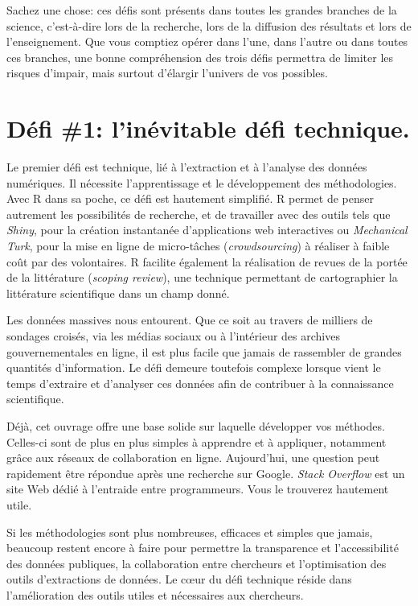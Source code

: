 \documentclass[
  letterpaper,
]{scrbook}
\begin{document}
Sachez une chose: ces défis sont présents dans toutes les grandes
branches de la science, c'est-à-dire lors de la recherche, lors de la
diffusion des résultats et lors de l'enseignement. Que vous comptiez
opérer dans l'une, dans l'autre ou dans toutes ces branches, une bonne
compréhension des trois défis permettra de limiter les risques d'impair,
mais surtout d'élargir l'univers de vos possibles.

\hypertarget{duxe9fi-1-linuxe9vitable-duxe9fi-technique.}{%
\section{Défi \#1: l'inévitable défi
technique.}\label{duxe9fi-1-linuxe9vitable-duxe9fi-technique.}}

Le premier défi est technique, lié à l'extraction et à l'analyse des
données numériques. Il nécessite l'apprentissage et le développement des
méthodologies. Avec R dans sa poche, ce défi est hautement simplifié. R
permet de penser autrement les possibilités de recherche, et de
travailler avec des outils tels que \emph{Shiny}, pour la création
instantanée d'applications web interactives ou \emph{Mechanical Turk},
pour la mise en ligne de micro-tâches (\emph{crowdsourcing}) à réaliser
à faible coût par des volontaires. R facilite également la réalisation
de revues de la portée de la littérature (\emph{scoping review}), une
technique permettant de cartographier la littérature scientifique dans
un champ donné.

Les données massives nous entourent. Que ce soit au travers de milliers
de sondages croisés, via les médias sociaux ou à l'intérieur des
archives gouvernementales en ligne, il est plus facile que jamais de
rassembler de grandes quantités d'information. Le défi demeure toutefois
complexe lorsque vient le temps d'extraire et d'analyser ces données
afin de contribuer à la connaissance scientifique.

Déjà, cet ouvrage offre une base solide sur laquelle développer vos
méthodes. Celles-ci sont de plus en plus simples à apprendre et à
appliquer, notamment grâce aux réseaux de collaboration en ligne.
Aujourd'hui, une question peut rapidement être répondue après une
recherche sur Google. \emph{Stack Overflow} est un site Web dédié à
l'entraide entre programmeurs. Vous le trouverez hautement utile.

Si les méthodologies sont plus nombreuses, efficaces et simples que
jamais, beaucoup restent encore à faire pour permettre la transparence
et l'accessibilité des données publiques, la collaboration entre
chercheurs et l'optimisation des outils d'extractions de données. Le
cœur du défi technique réside dans l'amélioration des outils utiles et
nécessaires aux chercheurs.
\end{document}
